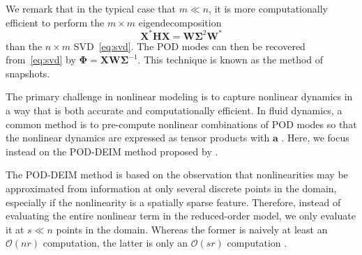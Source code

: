 \documentclass[11pt]{article}
\renewcommand*{\O}{\mathcal{O}}
\renewcommand*{\H}{\mathbf{H}}
\newcommand*{\X}{\mathbf{X}}
\newcommand*{\W}{\mathbf{W}}
\newcommand*{\PHI}{\mathbf{\Phi}}
\newcommand*{\SIGMA}{\mathbf{\Sigma}}
\renewcommand*{\a}{\mathbf{a}}
\begin{document}
We remark that in the typical case that $m \ll n$, it is more computationally efficient to perform the $m \times m$ eigendecomposition
\begin{equation}
    \X^* \H \X = \W \SIGMA^2 \W^*
\end{equation}
than the $n \times m$ SVD~\eqref{eq:svd}.
The POD modes can then be recovered from~\eqref{eq:svd} by $\PHI = \X \W \SIGMA^{-1}$.
This technique is known as the method of snapshots.

The primary challenge in nonlinear modeling is to capture nonlinear dynamics in a way that is both accurate and computationally efficient.
In fluid dynamics, a common method is to pre-compute nonlinear combinations of POD modes so that the nonlinear dynamics are expressed as tensor products with $\a$ \citep[see, e.g.,][(3.8)]{NoackJFM03}.
Here, we focus instead on the POD-DEIM method proposed by \citet{ChaturantabutIEEECDC09, ChaturantabutRice09a}.

The POD-DEIM method is based on the observation that nonlinearities may be approximated from information at only several discrete points in the domain, especially if the nonlinearity is a spatially sparse feature.
Therefore, instead of evaluating the entire nonlinear term in the reduced-order model, we only evaluate it at $s \ll n$ points in the domain.
Whereas the former is naively at least an $\O(n r)$ computation, the latter is only an $\O(s r)$ computation \citep{ChaturantabutIEEECDC09,ChaturantabutRice09a}.
\end{document}
